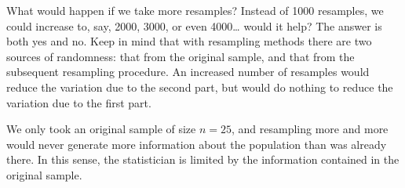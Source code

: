 \documentclass[captions=tableheading]{scrbook}
\begin{document}
\begin{rem}
What would happen if we take more resamples? Instead of 1000 resamples, we could increase to, say, 2000, 3000, or even 4000\ldots{} would it help? The answer is both yes and no. Keep in mind that with resampling methods there are two sources of randomness: that from the original sample, and that from the subsequent resampling procedure. An increased number of resamples would reduce the variation due to the second part, but would do nothing to reduce the variation due to the first part.

We only took an original sample of size \(n=25\), and resampling more and more would never generate more information about the population than was already there. In this sense, the statistician is limited by the information contained in the original sample. 
\end{rem}
\end{document}
